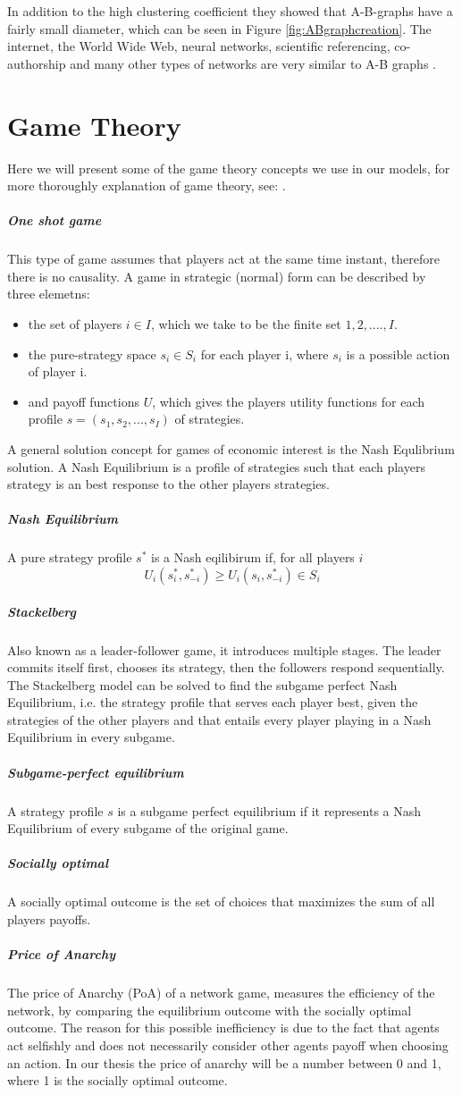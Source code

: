 In addition to the high clustering coefficient they showed that A-B-graphs have a fairly small diameter,
 which can be seen in Figure \ref{fig:ABgraphcreation}. 
The internet, the World Wide Web, neural networks, scientific referencing, co-authorship and many other types of networks are very similar to A-B graphs \cite{audestad}.

\section{Game Theory}
Here we will present some of the game theory concepts we use in our models, for more thoroughly explanation of game theory, see: \cite{nisan2007algorithmic, watson2008strategy}.
\subparagraph{One shot game}
This type of game assumes that players act at the same time instant, therefore there is no causality. A game in strategic (normal) form can be described by three elemetns:
\begin{itemize}
\item the set of players $i \in I$, which we take to be the finite set ${1,2,....,I}$.
\item the pure-strategy space $s_{i}\in S_{i}$ for each player i, where $s_{i}$ is a possible action of player i.
\item and payoff functions $U$, which gives the players utility functions for each profile $s=(s_{1},s_{2},...,s_{I})$ of strategies.
\end{itemize}
A general solution concept for games of economic interest is the Nash Equlibrium solution. A Nash Equilibrium is a profile of strategies such that each players strategy is an best response to the other players strategies. 
\subparagraph{Nash Equilibrium}
A pure strategy profile $s^{*}$ is a Nash eqilibirum if, for all players $i$
\begin{equation}
U_{i}(s^{*}_{i},s_{-i}^{*})\geq U_{i}(s_{i},s^{*}_{-i}) \in S_{i}
\end{equation}
\subparagraph{Stackelberg}
Also known as a leader-follower game, it introduces multiple stages. The leader commits itself first, chooses its strategy, then the followers respond sequentially. The Stackelberg model can be solved to find the subgame perfect Nash Equilibrium, i.e. the strategy profile that serves each player best, given the strategies of the other players and that entails every player playing in a Nash Equilibrium in every subgame.
\subparagraph{Subgame-perfect equilibrium}
A strategy profile $s$ is a subgame perfect equilibrium if it represents a Nash Equilibrium of every subgame of the original game.
\subparagraph{Socially optimal}
A socially optimal outcome is the set of choices that maximizes the sum of all players payoffs. 
\subparagraph{Price of Anarchy}
The price of Anarchy (PoA) of a network game, measures the efficiency of the network, by comparing the equilibrium outcome with the socially optimal outcome. The reason for this possible inefficiency is due to the fact that agents act selfishly and does not necessarily consider other agents payoff when choosing an action. In our thesis the price of anarchy will be a number between 0 and 1, where 1 is the socially optimal outcome.

